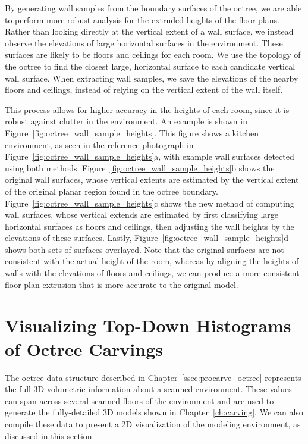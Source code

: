\documentclass[12pt,onecolumn,oneside]{book}
\begin{document}
By generating wall samples from the boundary surfaces of the octree, we are able to perform more robust analysis for the extruded heights of the floor plans.  Rather than looking directly at the vertical extent of a wall surface, we instead observe the elevations of large horizontal surfaces in the environment.  These surfaces are likely to be floors and ceilings for each room.  We use the topology of the octree to find the closest large, horizontal surface to each candidate vertical wall surface.  When extracting wall samples, we save the elevations of the nearby floors and ceilings, instead of relying on the vertical extent of the wall itself.

This process allows for higher accuracy in the heights of each room, since it is robust against clutter in the environment.  An example is shown in Figure~\ref{fig:octree_wall_sample_heights}.  This figure shows a kitchen environment, as seen in the reference photograph in Figure~\ref{fig:octree_wall_sample_heights}a, with example wall surfaces detected using both methods.  Figure~\ref{fig:octree_wall_sample_heights}b shows the original wall surfaces, whose vertical extents are estimated by the vertical extent of the original planar region found in the octree boundary.  Figure~\ref{fig:octree_wall_sample_heights}c shows the new method of computing wall surfaces, whose vertical extends are estimated by first classifying large horizontal surfaces as floors and ceilings, then adjusting the wall heights by the elevations of these surfaces.  Lastly, Figure~\ref{fig:octree_wall_sample_heights}d shows both sets of surfaces overlayed.  Note that the original surfaces are not consistent with the actual height of the room, whereas by aligning the heights of walls with the elevations of floors and ceilings, we can produce a more consistent floor plan extrusion that is more accurate to the original model.

\FloatBarrier
\section{Visualizing Top-Down Histograms of Octree Carvings}
\label{sec:hia}

The octree data structure described in Chapter~\ref{ssec:procarve_octree} represents the full 3D volumetric information about a scanned environment.  These values can span across several scanned floors of the environment and are used to generate the fully-detailed 3D models shown in Chapter~\ref{ch:carving}.  We can also compile these data to present a 2D visualization of the modeling environment, as discussed in this section.
\end{document}
